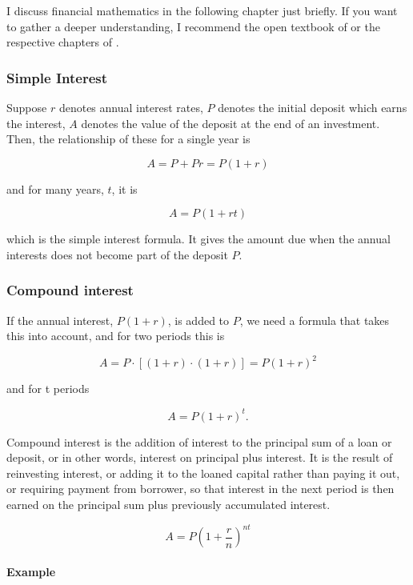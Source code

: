 \documentclass[
  12pt,
  oneside]{book}
\theoremstyle{definition}
\theoremstyle{definition}
\theoremstyle{definition}
\theoremstyle{definition}
\theoremstyle{remark}
\begin{document}
I discuss financial mathematics in the following chapter just briefly. If you want to gather a deeper understanding, I recommend the open textbook of \citet{Dahlquist2022Principles} or the respective chapters of \citet{Wilkinson2022Managerial}.

\subsubsection{Simple Interest}\label{simple-interest}

Suppose \(r\) denotes annual interest rates, \(P\) denotes the initial deposit which earns the interest, \(A\) denotes the value of the deposit at the end of an investment. Then, the relationship of these for a single year is

\[
A=P+Pr=P(1+r)
\]

and for many years, \(t\), it is

\[
A=P(1+rt)
\]

which is the simple interest formula. It gives the amount due when the annual interests does not become part of the deposit \(P\).

\subsubsection{Compound interest}\label{compound-interest}

If the annual interest, \(P(1+r)\), is added to \(P\), we need a formula that takes this into account, and for two periods this is

\[
A=P\cdot  [(1+r)\cdot(1+r)]=P(1+r)^2
\]

and for t periods

\[
A=P(1+r)^t.
\]

Compound interest is the addition of interest to the principal sum of a loan or deposit, or in other words, interest on principal plus interest. It is the result of reinvesting interest, or adding it to the loaned capital rather than paying it out, or requiring payment from borrower, so that interest in the next period is then earned on the principal sum plus previously accumulated interest.

\[
A=P\left(1+\frac{r}{n}\right)^{nt}
\]

\paragraph*{Example}\label{example}
\end{document}

